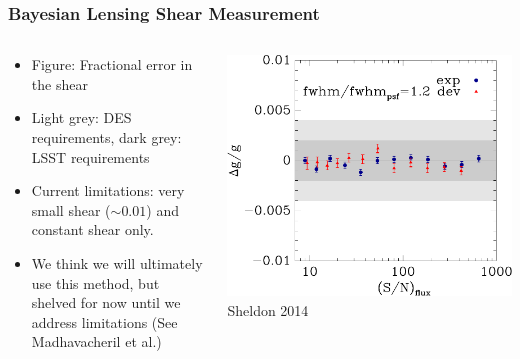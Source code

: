 \documentclass{beamer}
\begin{document}
\frame
{
    \frametitle{Bayesian Lensing Shear Measurement}

    \fontsize{9}{0.8\baselineskip}
    \begin{columns}
        \begin{column}{0.4\textwidth}
            \begin{itemize}

                \item Figure: Fractional error in the shear

                \item Light grey: DES requirements, dark grey: LSST requirements

                \item Current limitations:  very small shear ($\sim 0.01$) and 
                    constant shear only.

                \item We think we will ultimately use this method, but shelved
                    for now until we address limitations (See Madhavacheril et
                    al.)

            \end{itemize}
        \end{column}
        \begin{column}{0.6\textwidth}
            \begin{center}
                \includegraphics[width=\textwidth]{ngmix-flux-s2n-sigrat-20.pdf}
                \newline
                Sheldon 2014
            \end{center}
        \end{column}
    \end{columns}

}
\end{document}
